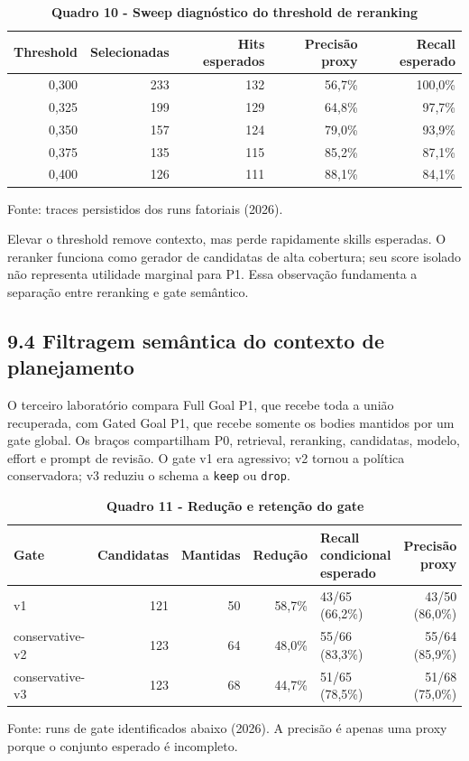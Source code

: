\documentclass[12pt,a4paper]{article}
\begin{document}
\begin{table}[H]
\centering
\caption*{\textbf{Quadro 10 - Sweep diagnóstico do threshold de reranking}}
\small
\renewcommand{\arraystretch}{1.12}
\begin{tabular}{|r|r|r|r|r|}
\hline
\textbf{Threshold} & \textbf{Selecionadas} & \textbf{Hits esperados} & \textbf{Precisão proxy} & \textbf{Recall esperado} \\
\hline
0,300 & 233 & 132 & 56,7\% & 100,0\% \\
\hline
0,325 & 199 & 129 & 64,8\% & 97,7\% \\
\hline
0,350 & 157 & 124 & 79,0\% & 93,9\% \\
\hline
0,375 & 135 & 115 & 85,2\% & 87,1\% \\
\hline
0,400 & 126 & 111 & 88,1\% & 84,1\% \\
\hline
\end{tabular}
\par\smallskip\raggedright\small Fonte: traces persistidos dos runs fatoriais (2026).
\end{table}

Elevar o threshold remove contexto, mas perde rapidamente skills esperadas. O reranker funciona como gerador de candidatas de alta cobertura; seu score isolado não representa utilidade marginal para P1. Essa observação fundamenta a separação entre reranking e gate semântico.

\subsection*{9.4 Filtragem semântica do contexto de planejamento}

O terceiro laboratório compara Full Goal P1, que recebe toda a união recuperada, com Gated Goal P1, que recebe somente os bodies mantidos por um gate global. Os braços compartilham P0, retrieval, reranking, candidatas, modelo, effort e prompt de revisão. O gate v1 era agressivo; v2 tornou a política conservadora; v3 reduziu o schema a \texttt{keep} ou \texttt{drop}.

\begin{table}[H]
\centering
\caption*{\textbf{Quadro 11 - Redução e retenção do gate}}
\footnotesize
\renewcommand{\arraystretch}{1.12}
\begin{tabularx}{\linewidth}{|l|r|r|r|Y|r|}
\hline
\textbf{Gate} & \textbf{Candidatas} & \textbf{Mantidas} & \textbf{Redução} &
\textbf{Recall condicional esperado} & \textbf{Precisão proxy} \\
\hline
v1 & 121 & 50 & 58,7\% & 43/65 (66,2\%) & 43/50 (86,0\%) \\
\hline
conservative-v2 & 123 & 64 & 48,0\% & 55/66 (83,3\%) & 55/64 (85,9\%) \\
\hline
conservative-v3 & 123 & 68 & 44,7\% & 51/65 (78,5\%) & 51/68 (75,0\%) \\
\hline
\end{tabularx}
\par\smallskip\raggedright\small Fonte: runs de gate identificados abaixo (2026). A precisão é apenas uma proxy porque o conjunto esperado é incompleto.
\end{table}
\end{document}
